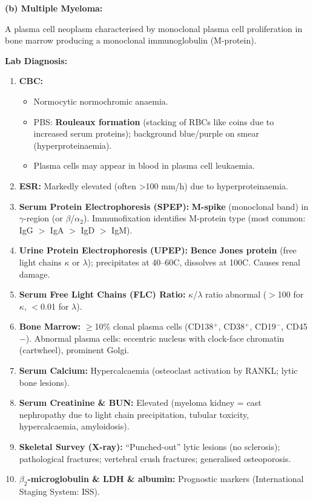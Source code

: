 \documentclass[11pt,a4paper]{article}
\begin{document}
\begin{ansbox}
\textbf{(b) Multiple Myeloma:}

A plasma cell neoplasm characterised by monoclonal plasma cell proliferation in bone marrow producing a monoclonal immunoglobulin (M-protein).

\textbf{Lab Diagnosis:}
\begin{enumerate}[leftmargin=*]
    \item \textbf{CBC:}
    \begin{itemize}
        \item Normocytic normochromic anaemia.
        \item PBS: \textbf{Rouleaux formation} (stacking of RBCs like coins due to increased serum proteins); background blue/purple on smear (hyperproteinaemia).
        \item Plasma cells may appear in blood in plasma cell leukaemia.
    \end{itemize}
    \item \textbf{ESR:} Markedly elevated (often \textgreater{}100 mm/h) due to hyperproteinaemia.
    \item \textbf{Serum Protein Electrophoresis (SPEP):} \textbf{M-spike} (monoclonal band) in $\gamma$-region (or $\beta$/$\alpha_2$). Immunofixation identifies M-protein type (most common: IgG $>$ IgA $>$ IgD $>$ IgM).
    \item \textbf{Urine Protein Electrophoresis (UPEP):} \textbf{Bence Jones protein} (free light chains $\kappa$ or $\lambda$); precipitates at 40--60\textdegree C, dissolves at 100\textdegree C. Causes renal damage.
    \item \textbf{Serum Free Light Chains (FLC) Ratio:} $\kappa$/$\lambda$ ratio abnormal ($>$100 for $\kappa$, $<$0.01 for $\lambda$).
    \item \textbf{Bone Marrow:} $\geq$10\% clonal plasma cells (CD138$^+$, CD38$^+$, CD19$^-$, CD45$-$). Abnormal plasma cells: eccentric nucleus with clock-face chromatin (cartwheel), prominent Golgi.
    \item \textbf{Serum Calcium:} Hypercalcaemia (osteoclast activation by RANKL; lytic bone lesions).
    \item \textbf{Serum Creatinine \& BUN:} Elevated (myeloma kidney = cast nephropathy due to light chain precipitation, tubular toxicity, hypercalcaemia, amyloidosis).
    \item \textbf{Skeletal Survey (X-ray):} ``Punched-out'' lytic lesions (no sclerosis); pathological fractures; vertebral crush fractures; generalised osteoporosis.
    \item \textbf{$\beta_2$-microglobulin \& LDH \& albumin:} Prognostic markers (International Staging System: ISS).
\end{enumerate}
\end{ansbox}
\end{document}
